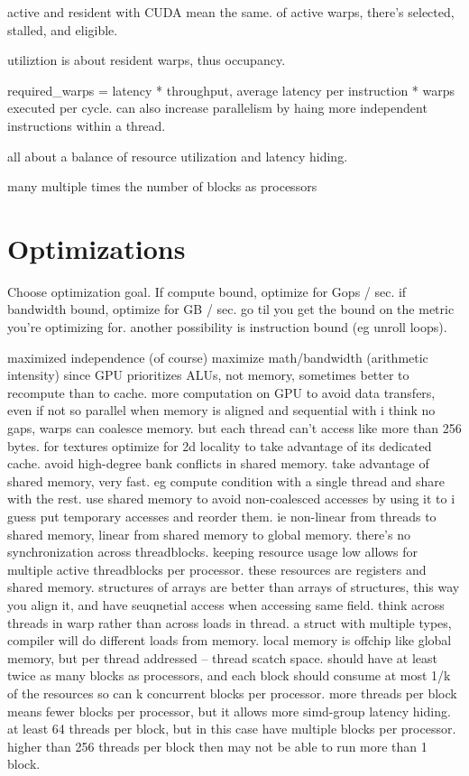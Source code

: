 active and resident with CUDA mean the same.
of active warps, there's selected, stalled, and eligible.

utiliztion is about resident warps, thus occupancy.

required_warps = latency * throughput, average latency per instruction * warps executed per cycle.
can also increase parallelism by haing more independent instructions within a thread. 

all about a balance of resource utilization and latency hiding. 

many multiple times the number of blocks as processors

\section{Optimizations}

Choose optimization goal.
If compute bound, optimize for Gops / sec.
if bandwidth bound, optimize for GB / sec. 
go til you get the bound on the metric you're optimizing for. 
another possibility is instruction bound (eg unroll loops).

maximized independence (of course)
maximize math/bandwidth (arithmetic intensity)
since GPU prioritizes ALUs, not memory, sometimes better to recompute than to cache. 
more computation on GPU to avoid data transfers, even if not so parallel
when memory is aligned and sequential with i think no gaps, warps can coalesce memory. but each thread can't access like more than 256 bytes. 
for textures optimize for 2d locality to take advantage of its dedicated cache. 
avoid high-degree bank conflicts in shared memory.
take advantage of shared memory, very fast. eg compute condition with a single thread and share with the rest. 
use shared memory to avoid non-coalesced accesses by using it to i guess put temporary accesses and reorder them. ie non-linear from threads to shared memory, linear from shared memory to global memory. 
there's no synchronization across threadblocks. 
keeping resource usage low allows for multiple active threadblocks per processor. these resources are registers and shared memory. 
structures of arrays are better than arrays of structures, this way you align it, and have seuqnetial access when accessing same field. think across threads in warp rather than across loads in thread. a struct with multiple types, compiler will do different loads from memory. 
local memory is offchip like global memory, but per thread addressed -- thread scatch space. 
should have at least twice as many blocks as processors, and each block should consume at most 1/k of the resources so can k concurrent blocks per processor. 
more threads per block means fewer blocks per processor, but it allows more simd-group latency hiding. 
at least 64 threads per block, but in this case have multiple blocks per processor. 
higher than 256 threads per block then may not be able to run more than 1 block. 

